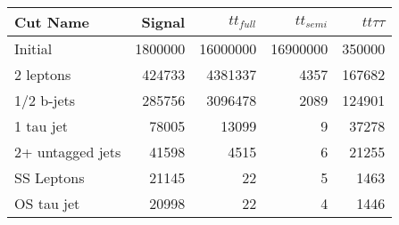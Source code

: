 \begin{tabular}{lrrrr}
\toprule
         Cut Name &   Signal &  $tt_{full}$ &  $tt_{semi}$ &  $tt\tau\tau$ \\
\midrule
          Initial &  1800000 &     16000000 &     16900000 &        350000 \\
        2 leptons &   424733 &      4381337 &         4357 &        167682 \\
       1/2 b-jets &   285756 &      3096478 &         2089 &        124901 \\
        1 tau jet &    78005 &        13099 &            9 &         37278 \\
 2+ untagged jets &    41598 &         4515 &            6 &         21255 \\
       SS Leptons &    21145 &           22 &            5 &          1463 \\
       OS tau jet &    20998 &           22 &            4 &          1446 \\
\bottomrule
\end{tabular}
